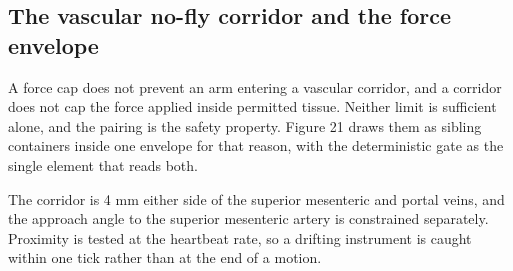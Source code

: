 \vspace{-0.7cm}

\subsection{The vascular no-fly corridor and the force envelope}

A force cap does not prevent an arm entering a vascular corridor, and a corridor
does not cap the force applied inside permitted tissue. Neither limit is
sufficient alone, and the pairing is the safety property. Figure 21 draws them
as sibling containers inside one envelope for that reason, with the
deterministic gate as the single element that reads both.

The corridor is 4 mm either side of the superior mesenteric and portal veins,
and the approach angle to the superior mesenteric artery is constrained
separately. Proximity is tested at the heartbeat rate, so a drifting instrument
is caught within one tick rather than at the end of a motion.

